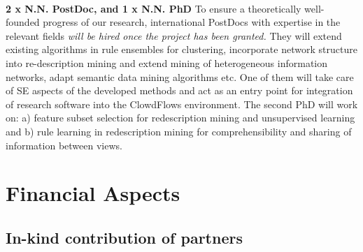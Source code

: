 \documentclass[a4paper,11pt]{article}
\begin{document}
\\[0,2cm]
\textbf{2 x N.N. PostDoc, and 1 x N.N. PhD} To ensure a theoretically well-founded progress of our research, international PostDocs with expertise in the relevant fields \textit{will be hired once the project has been granted.} They will extend existing algorithms in rule ensembles for clustering, incorporate network structure into re-description mining and extend mining of heterogeneous information networks, adapt semantic data mining algorithms etc. One of them will take care of SE aspects of the developed methods and act as an entry point for integration of research software into the ClowdFlows environment. The second PhD will work on: a) feature subset selection for redescription mining and unsupervised learning and b) rule learning in redescription mining for comprehensibility and sharing of information between views. 









\section{Financial Aspects}
%

\subsection{In-kind contribution of partners}
\end{document}
